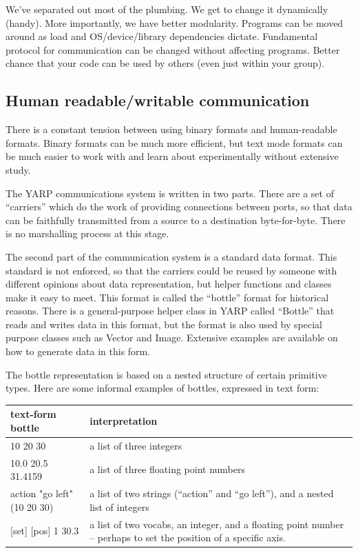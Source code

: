 
We've separated out most of the plumbing.  We get to change it
dynamically (handy).  More importantly, we have better modularity.
Programs can be moved around as load and OS/device/library
dependencies dictate.  Fundamental protocol for communication can be
changed without affecting programs.  Better chance that your code can
be used by others (even just within your group).



\subsection{Human readable/writable communication}

There is a constant tension between using binary formats and
human-readable formats.  Binary formats can be much more efficient,
but text mode formats can be much easier to work with and learn about
experimentally without extensive study.

The YARP communications system is written in two parts.  There
are a set of ``carriers'' which do the work of providing
connections between ports, so that data can be faithfully 
transmitted from a source to a destination byte-for-byte.
There is no marshalling process at this stage.

The second part of the communication system is a standard data format.
This standard is not enforced, so that the carriers could be reused by
someone with different opinions about data representation, but helper
functions and classes make it easy to meet.  This format is called the
``bottle'' format for historical reasons.  There is a general-purpose
helper class in YARP called ``Bottle'' that reads and writes data in
this format, but the format is also used by special purpose classes
such as Vector and Image.  Extensive examples are available on how
to generate data in this form.

The bottle representation is based on a nested structure of certain
primitive types.  
Here are some informal examples of bottles, expressed in text form:

\begin{center}
\begin{tabular}{lp{6cm}}
\hline\hline
{\bf text-form bottle} & {\bf interpretation} \\
\hline
10 20 30 & a list of three integers \\
10.0 20.5 31.4159 & a list of three floating point numbers \\
action "go left" (10 20 30) & a list of two strings (``action'' and ``go left''), and a nested list of integers \\
{[set] [pos] 1 30.3} & a list of two vocabs, an integer, and a floating
point number -- perhaps to set the position of a specific axis. \\
\hline\hline
\end{tabular}
\end{center}

